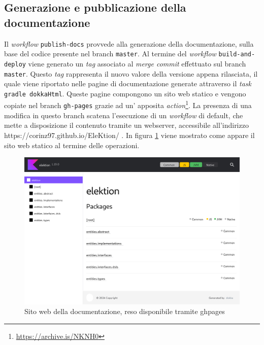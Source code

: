 \documentclass[12pt,a4paper,openright,twoside]{book}
\begin{document}
\subsection{Generazione e pubblicazione della documentazione}
Il \textit{workflow} \texttt{publish-docs} provvede alla generazione della documentazione, sulla base del codice presente
nel branch \texttt{master}. 
Al termine del \textit{workflow} \texttt{build-and-deploy} viene generato un \textit{tag}
associato al \textit{merge commit} effettuato sul branch \texttt{master}. Questo \textit{tag}
rappresenta il nuovo valore della versione appena rilasciata, il quale viene riportato nelle pagine di documentazione
generate attraverso il \textit{task} \texttt{gradle dokkaHtml}.
Queste pagine compongono un sito web statico e vengono copiate nel branch \texttt{gh-pages} grazie ad un'
apposita \textit{action}\footnote{\url{https://archive.is/NKNH0}}. 
La presenza di una modifica in questo branch scatena l'esecuzione di un \textit{workflow} di default,
che mette a disposizione il contenuto tramite un webserver, accessibile all'indirizzo https://corinz97.github.io/EleKtion/ .
In figura \ref{fig:dokkaSchermata} viene mostrato come appare il sito web statico al termine delle operazioni.
\begin{figure}
    \centering
   
     \includegraphics[width=1.05\linewidth]{figures/schermatadocumentazione.pdf}
     \caption{Sito web della documentazione, reso disponibile tramite \ac{ghpages} }
     \label{fig:dokkaSchermata}
 \end{figure}
\end{document}
